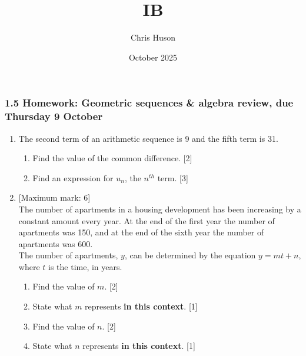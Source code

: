 \documentclass[12pt, twoside]{article}
\title{IB}
\author{Chris Huson}
\date{October 2025}
\begin{document}
\subsubsection*{1.5 Homework: Geometric sequences \& algebra review, due Thursday 9 October}
\begin{enumerate}[itemsep=0.5cm]
    \item The second term of an arithmetic sequence is 9 and the fifth term is 31.
    \begin{enumerate}[itemsep=0.25cm]
        \item Find the value of the common difference. \hfill [2]
        \item Find an expression for $u_n$, the $n^{th}$ term.  \hfill [3]
    \end{enumerate}
    
\item {[Maximum mark: 6]} \\[0.3cm]
    The number of apartments in a housing development has been increasing by a constant amount every year. At the end of the first year the number of apartments was 150, and at the end of the sixth year the number of apartments was 600. \\[0.25cm]
    The number of apartments, $y$, can be determined by the equation $y=mt+n$, where $t$ is the time, in years.
    \begin{enumerate}[itemsep=0.25cm]
        \item Find the value of $m$. \hfill [2]
        \item State what $m$ represents \textbf{in this context}. \hfill [1]
        \item Find the value of $n$. \hfill [2]
        \item State what $n$ represents \textbf{in this context}. \hfill [1]
    \end{enumerate}


\end{enumerate}
\end{document}
